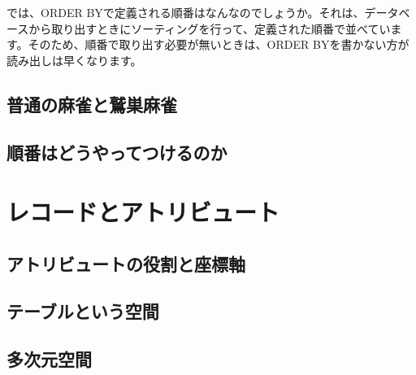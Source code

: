 では、ORDER BYで定義される順番はなんなのでしょうか。それは、データベースから取り出すときにソーティングを行って、定義された順番で並べています。そのため、順番で取り出す必要が無いときは、ORDER BYを書かない方が読み出しは早くなります。

\subsection{普通の麻雀と鷲巣麻雀}



\subsection{順番はどうやってつけるのか}

\section{レコードとアトリビュート}


\subsection{アトリビュートの役割と座標軸}

\subsection{テーブルという空間}

\subsection{多次元空間}